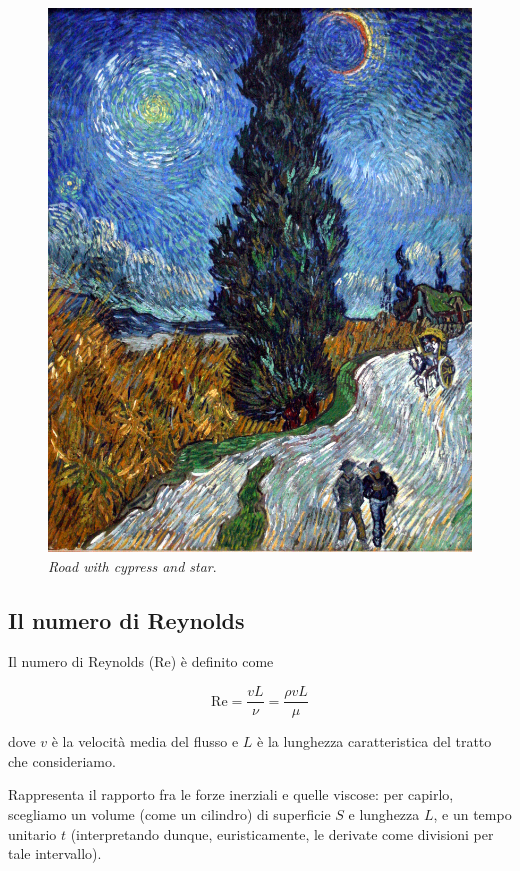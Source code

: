\documentclass[12pt,a4paper]{article}
\numberwithin{equation}{section}
\begin{document}
\begin{figure}
    \centering
    \includegraphics[scale=0.12]{road_cypress.jpg}
    \caption{\emph{Road with cypress and star}.}
    \label{road}
\end{figure}


\subsection{Il numero di Reynolds}

Il numero di Reynolds ($\text{Re}$) è definito come

\begin{equation}
\text{Re} = \frac{v L}{\nu} = \frac{\rho v L}{\mu}
\end{equation}

dove $v$ è la velocità media del flusso e $L$ è la lunghezza caratteristica del tratto che consideriamo.

Rappresenta il rapporto fra le forze inerziali e quelle viscose: per capirlo, scegliamo un volume (come un cilindro) di superficie $S$ e lunghezza $L$, e un tempo unitario $t$ (interpretando dunque, euristicamente, le derivate come divisioni per tale intervallo).
\end{document}
